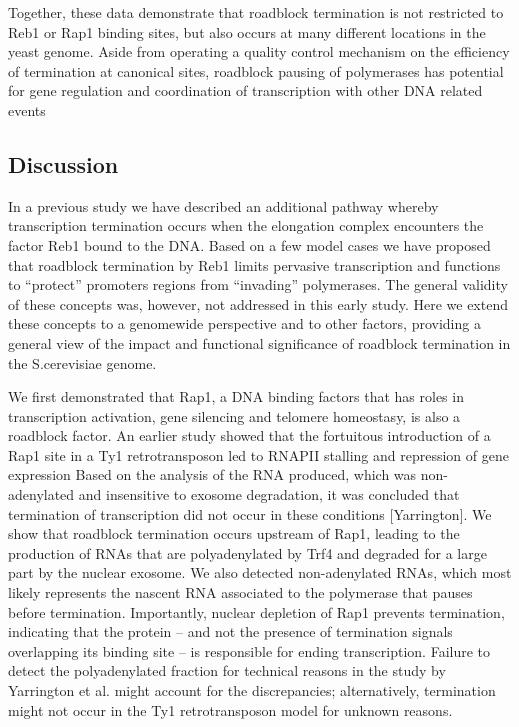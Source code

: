 Together, these data demonstrate that roadblock termination is not restricted to Reb1 or Rap1 binding sites, but also occurs at many different locations in the yeast genome. Aside from operating a quality control mechanism on the efficiency of termination at canonical sites, roadblock pausing of polymerases has potential for gene regulation and coordination of transcription with other DNA related events

\subsection{Discussion}


In a previous study we have described an additional pathway whereby transcription termination occurs when the elongation complex encounters the factor Reb1 bound to the DNA. Based on a few model cases we have proposed that roadblock termination by Reb1 limits pervasive transcription and functions to “protect” promoters regions from “invading” polymerases. The general validity of these concepts was, however, not addressed in this early study. Here we extend these concepts to a genomewide perspective and to other factors, providing a general view of the impact and functional significance of roadblock termination in the S.cerevisiae genome.  

We first demonstrated that Rap1, a DNA binding factors that has roles in transcription activation, gene silencing and telomere homeostasy, is also a roadblock factor. An earlier study showed that the fortuitous introduction of a Rap1 site in a Ty1 retrotransposon led to RNAPII stalling and repression of gene expression Based on the analysis of the RNA produced, which was non-adenylated and insensitive to exosome degradation, it was concluded that termination of transcription did not occur in these conditions [Yarrington]. We show that roadblock termination occurs upstream of Rap1, leading to the production of RNAs that are polyadenylated by Trf4 and degraded for a large part by the nuclear exosome. We also detected non-adenylated RNAs, which most likely represents the nascent RNA associated to the polymerase that pauses before termination. Importantly, nuclear depletion of Rap1 prevents termination, indicating that the protein – and not the presence of termination signals overlapping its binding site – is responsible for ending transcription. Failure to detect the polyadenylated fraction for technical reasons in the study by Yarrington et al. might account for the discrepancies; alternatively, termination might not occur in the Ty1 retrotransposon model for unknown reasons.


